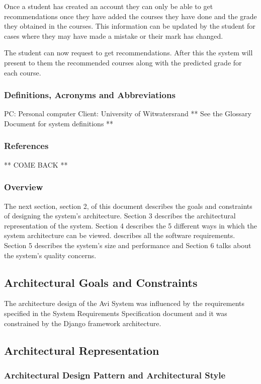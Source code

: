 \documentclass[10pt]{article}
\begin{document}
Once a student has created an account they can only be able to get recommendations once they have added the courses they have done and the grade they obtained in the courses. This information can be updated by the student for cases where they may have made a mistake or their mark has changed.

The student can now request to get recommendations. After this the system will present to them the recommended courses along with the predicted grade for each course.

\subsubsection{Definitions, Acronyms and Abbreviations}
PC:  Personal computer
Client: University of Witwatersrand
** See the Glossary Document for system definitions **
\subsubsection{References}
** COME BACK **

\subsubsection{Overview}

The next section, section 2, of this document describes the goals and constraints of designing the system’s architecture. Section 3 describes the architectural representation of the system. Section 4 describes the 5 different ways in which the system architecture can be viewed.  describes all the software requirements. Section 5 describes the system’s size and performance and Section 6 talks about the system’s quality concerns.

\subsection{Architectural Goals and Constraints}

The architecture design of the Avi System was influenced by the requirements specified in the System Requirements Specification document and it was constrained by the Django framework architecture.

\subsection{Architectural Representation}


\subsubsection{Architectural Design Pattern and Architectural Style}
\end{document}
